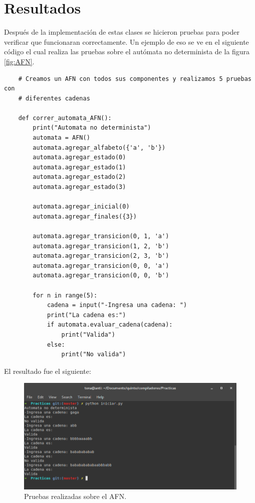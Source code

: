 \documentclass[titlepage]{article}
\begin{document}
	\section{Resultados}
	Después de la implementación de estas clases se hicieron pruebas para poder verificar que funcionaran correctamente. Un ejemplo de eso se ve en el siguiente código el cual realiza las pruebas sobre el autómata no determinista de la figura \ref{fig:AFN}.
	
	\begin{lstlisting}
	# Creamos un AFN con todos sus componentes y realizamos 5 pruebas con
	# diferentes cadenas
	
	def correr_automata_AFN():
		print("Automata no determinista")
		automata = AFN()
		automata.agregar_alfabeto({'a', 'b'})
		automata.agregar_estado(0)
		automata.agregar_estado(1)
		automata.agregar_estado(2)
		automata.agregar_estado(3)
		
		automata.agregar_inicial(0)
		automata.agregar_finales({3})
		
		automata.agregar_transicion(0, 1, 'a')
		automata.agregar_transicion(1, 2, 'b')
		automata.agregar_transicion(2, 3, 'b')
		automata.agregar_transicion(0, 0, 'a')
		automata.agregar_transicion(0, 0, 'b')
		
		for n in range(5):
			cadena = input("-Ingresa una cadena: ")
			print("La cadena es:")
			if automata.evaluar_cadena(cadena):
				print("Valida")
			else:
				print("No valida")
	\end{lstlisting}
	
	El resultado fue el siguiente:
	
	\begin{figure}[H]
		\begin{center}
			\includegraphics[width=16cm]{AFNprueba.png}
			\caption{Pruebas realizadas sobre el AFN.}
			\label{fig:AFN2}
		\end{center}
	\end{figure}
	
\end{document}

